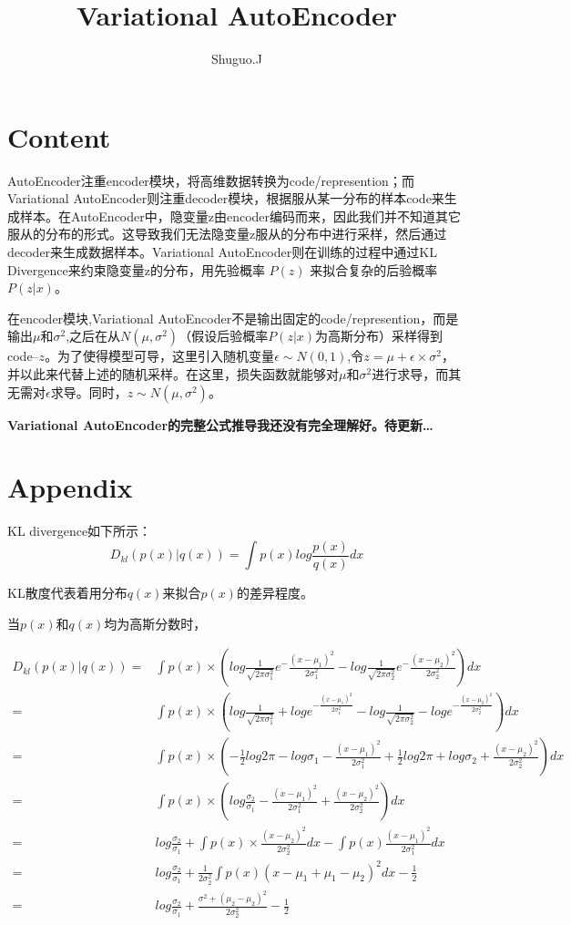 \documentclass[UTF8]{ctexart}
\title{Variational AutoEncoder}
\author{Shuguo.J}
\begin{document}
\maketitle
\section*{Content}
AutoEncoder注重encoder模块，将高维数据转换为code/represention；而Variational AutoEncoder则注重decoder模块，根据服从某一分布的样本code来生成样本。在AutoEncoder中，隐变量z由encoder编码而来，因此我们并不知道其它服从的分布的形式。这导致我们无法隐变量z服从的分布中进行采样，然后通过decoder来生成数据样本。Variational AutoEncoder则在训练的过程中通过KL Divergence来约束隐变量z的分布，用先验概率 $P(z)$ 来拟合复杂的后验概率 $P(z|x)$。


在encoder模块,Variational AutoEncoder不是输出固定的code/represention，而是输出$\mu$和$\sigma^{2}$,之后在从$N(\mu,\sigma^{2})$（假设后验概率$P(z|x)$为高斯分布）采样得到code--$z$。为了使得模型可导，这里引入随机变量$\epsilon \sim N(0,1)$,令$z=\mu + \epsilon \times \sigma^2$，并以此来代替上述的随机采样。在这里，损失函数就能够对$\mu$和$\sigma^2$进行求导，而其无需对$\epsilon$求导。同时，$z\sim N(\mu, \sigma^2)$。

\textbf{Variational AutoEncoder的完整公式推导我还没有完全理解好。待更新\dots}

\section*{Appendix}
KL divergence如下所示：
\begin{equation}
D_{kl}(p(x)|q(x)) = \int{p(x)log \frac{p(x)}{q(x)}dx}
\end{equation}


KL散度代表着用分布$q(x)$来拟合$p(x)$的差异程度。

当$p(x)$和$q(x)$均为高斯分数时，


\begin{equation}
\begin{aligned}
D_{kl}(p(x)|q(x))=&\int{p(x)\times (log\frac{1}{\sqrt{2\pi \sigma^{2}_{1}}}e^-\frac{(x-\mu_{1})^{2}}{2\sigma^{2}_{1}}-log\frac{1}{\sqrt{2\pi \sigma^{2}_{2}}}e^-\frac{(x-\mu_{2})^{2}}{2\sigma^{2}_{2}})dx} \\
=&\int{p(x)\times (log\frac{1}{\sqrt{2\pi \sigma^2_1}}+loge^{-\frac{(x-\mu_1)^2}{2\sigma^2_1}}-log\frac{1}{\sqrt{2\pi \sigma^2_2}}-loge^{-\frac{(x-\mu_2)^2}{2\sigma^2_2}})dx}\\
=&\int{p(x)\times (-\frac{1}{2}log2\pi-log\sigma_1-\frac{(x-\mu_1)^2}{2\sigma^2_1}+\frac{1}{2}log2\pi+log\sigma_2+\frac{(x-\mu_2)^2}{2\sigma^2_2})dx}\\
=&\int{p(x)\times (log\frac{\sigma_2}{\sigma_1}-\frac{(x-\mu_1)^2}{2\sigma_1^2}+\frac{(x-\mu_2)^2}{2\sigma_2^2})dx}\\
=&log\frac{\sigma_2}{\sigma_1}+\int{p(x)\times \frac{(x-\mu_2)^2}{2\sigma_2^2}dx}-\int{p(x)\frac{(x-\mu_1)^2}{2\sigma_1^2}dx}\\
=&log\frac{\sigma_2}{\sigma_1}+\frac{1}{2\sigma_2^2}\int{p(x)(x-\mu_1+\mu_1-\mu_2)^2dx}-\frac{1}{2}\\
=&log\frac{\sigma_2}{\sigma_1}+\frac{\sigma^2+(\mu_2-\mu_2)^2}{2\sigma_2^2}-\frac{1}{2}
\end{aligned}
\end{equation}
\end{document}
